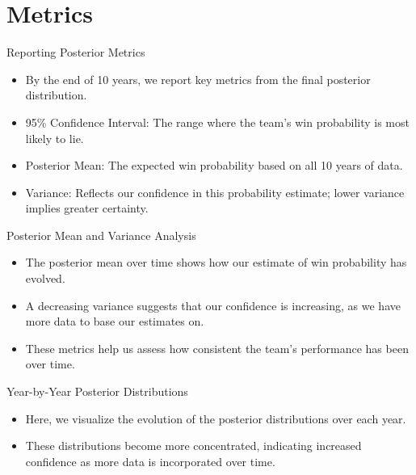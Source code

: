 \section{Metrics}

\begin{frame}{Reporting Posterior Metrics}

  \begin{itemize}
    \item By the end of 10 years, we report key metrics from the final posterior distribution.
    \item 95\% Confidence Interval: The range where the team’s win probability is most likely to lie.
    \item Posterior Mean: The expected win probability based on all 10 years of data.
    \item Variance: Reflects our confidence in this probability estimate; lower variance implies greater certainty.
  \end{itemize}
  
\end{frame}

\begin{frame}{Posterior Mean and Variance Analysis}

  \begin{itemize}
    \item The posterior mean over time shows how our estimate of win probability has evolved.
    \item A decreasing variance suggests that our confidence is increasing, as we have more data to base our estimates on.
    \item These metrics help us assess how consistent the team’s performance has been over time.
  \end{itemize}
  
\end{frame}

\begin{frame}{Year-by-Year Posterior Distributions}

  \begin{itemize}
    \item Here, we visualize the evolution of the posterior distributions over each year.
    \item These distributions become more concentrated, indicating increased confidence as more data is incorporated over time.
  \end{itemize}
  
\end{frame}
